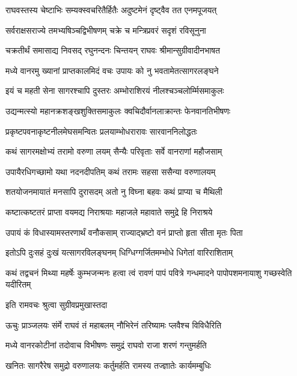 \twolineshloka
{राघवस्तस्य चेष्टाभिः सम्यक्स्वचरितैर्हितैः}
{अदुष्टमेनं दृष्ट्वैव तत एनमपूजयत्}%

\twolineshloka
{सर्वराक्षसराज्ये तमभ्यषिञ्चद्विभीषणम्}
{चक्रे च मन्त्रिप्रवरं सदृशं रविसूनुना}%

\twolineshloka
{चक्रतीर्थं समासाद्य निवसद् रघुनन्दनः}
{चिन्तयन् राघवः श्रीमान्सुग्रीवादीनभाषत}%

\twolineshloka
{मध्ये वानरमु ख्यानां प्राप्तकालमिदं वचः}
{उपायः को नु भवतामेतत्सागरलङ्घने}%

\twolineshloka
{इयं च महती सेना सागरश्चापि दुस्तरः}
{अम्भोराशिरयं नीलश्चञ्चलोर्म्मिसमाकुलः}%

\twolineshloka
{उद्यन्मत्स्यो महानक्रशङ्खशुक्तिसमाकुलः}
{क्वचिदौर्वानलाक्रान्तः फेनवानतिभीषणः}%

\twolineshloka
{प्रकृष्टपवनाकृष्टनीलमेघसमन्वितः}
{प्रलयाम्भोधरारावः सारवाननिलोद्धतः}%

\twolineshloka
{कथं सागरमक्षोभ्यं तरामो वरुणा लयम्}
{सैन्यैः परिवृताः सर्वे वानराणां महौजसाम्}%

\twolineshloka
{उपायैरधिगच्छामो यथा नदनदीपतिम्}
{कथं तरामः सहसा ससैन्या वरुणालयम्}%

\twolineshloka
{शतयोजनमायातं मनसापि दुरासदम्}
{अतो नु विघ्ना बहवः कथं प्राप्या च मैथिली}%

\twolineshloka
{कष्टात्कष्टतरं प्राप्ता वयमद्य निराश्रयाः}
{महाजले महावाते समुद्रे हि निराश्रये}%

\twolineshloka
{उपायं कं विधास्यामस्तरणार्थं वनौकसाम्}
{राज्याद्भ्रष्टो वनं प्राप्तो हृता सीता मृतः पिता}%

\twolineshloka
{इतोऽपि दुःसहं दुःखं यत्सागरविलङ्घनम्}
{धिग्धिग्गर्जितमम्भोधे धिगेतां वारिराशिताम्}%

\threelineshloka
{कथं तद्वचनं मिथ्या महर्षेः कुम्भजन्मनः}
{हत्वा त्वं रावणं पापं पवित्रे गन्धमादने}
{पापोपशमनायाशु गच्छस्वेति यदीरितम्}%


\onelineshloka
{इति रामवचः श्रुत्वा सुग्रीवप्रमुखास्तदा}%

\twolineshloka
{ऊचुः प्राञ्जलयः संर्मे राघवं तं महाबलम्}
{नौभिरेनं तरिष्यामः प्लवैश्च विविधैरिति}%

\twolineshloka
{मध्ये वानरकोटीनां तदोवाच विभीषणः}
{समुद्रं राघवो राजा शरणं गन्तुमर्हति}%

\twolineshloka
{खनितः सागरैरेष समुद्रो वरुणालयः}
{कर्तुमर्हति रामस्य तज्ज्ञातेः कार्यमम्बुधिः}%

